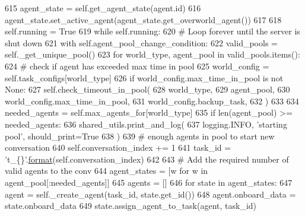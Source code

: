 \begin{DoxyCode}
615                 agent\_state = self.get\_agent\_state(agent.id)
616                 agent\_state.set\_active\_agent(agent\_state.get\_overworld\_agent())
617 
618         self.running = \textcolor{keyword}{True}
619         \textcolor{keywordflow}{while} self.running:
620             \textcolor{comment}{# Loop forever until the server is shut down}
621             with self.agent\_pool\_change\_condition:
622                 valid\_pools = self.\_get\_unique\_pool()
623                 \textcolor{keywordflow}{for} world\_type, agent\_pool \textcolor{keywordflow}{in} valid\_pools.items():
624                     \textcolor{comment}{# check if agent has exceeded max time in pool}
625                     world\_config = self.task\_configs[world\_type]
626                     \textcolor{keywordflow}{if} world\_config.max\_time\_in\_pool \textcolor{keywordflow}{is} \textcolor{keywordflow}{not} \textcolor{keywordtype}{None}:
627                         self.check\_timeout\_in\_pool(
628                             world\_type,
629                             agent\_pool,
630                             world\_config.max\_time\_in\_pool,
631                             world\_config.backup\_task,
632                         )
633 
634                     needed\_agents = self.max\_agents\_for[world\_type]
635                     \textcolor{keywordflow}{if} len(agent\_pool) >= needed\_agents:
636                         shared\_utils.print\_and\_log(
637                             logging.INFO, \textcolor{stringliteral}{'starting pool'}, should\_print=\textcolor{keyword}{True}
638                         )
639                         \textcolor{comment}{# enough agents in pool to start new conversation}
640                         self.conversation\_index += 1
641                         task\_id = \textcolor{stringliteral}{'t\_\{\}'}.\hyperlink{namespaceparlai_1_1chat__service_1_1services_1_1messenger_1_1shared__utils_a32e2e2022b824fbaf80c747160b52a76}{format}(self.conversation\_index)
642 
643                         \textcolor{comment}{# Add the required number of valid agents to the conv}
644                         agent\_states = [w \textcolor{keywordflow}{for} w \textcolor{keywordflow}{in} agent\_pool[:needed\_agents]]
645                         agents = []
646                         \textcolor{keywordflow}{for} state \textcolor{keywordflow}{in} agent\_states:
647                             agent = self.\_create\_agent(task\_id, state.get\_id())
648                             agent.onboard\_data = state.onboard\_data
649                             state.assign\_agent\_to\_task(agent, task\_id)

\end{DoxyCode}
